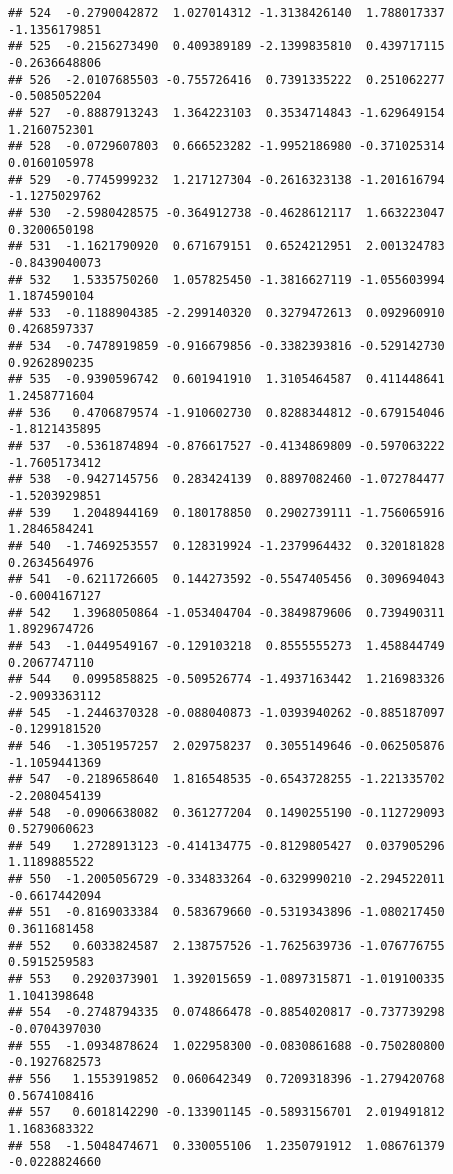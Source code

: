 \documentclass[
]{article}
\begin{document}
\begin{verbatim}
## 524  -0.2790042872  1.027014312 -1.3138426140  1.788017337 -1.1356179851
## 525  -0.2156273490  0.409389189 -2.1399835810  0.439717115 -0.2636648806
## 526  -2.0107685503 -0.755726416  0.7391335222  0.251062277 -0.5085052204
## 527  -0.8887913243  1.364223103  0.3534714843 -1.629649154  1.2160752301
## 528  -0.0729607803  0.666523282 -1.9952186980 -0.371025314  0.0160105978
## 529  -0.7745999232  1.217127304 -0.2616323138 -1.201616794 -1.1275029762
## 530  -2.5980428575 -0.364912738 -0.4628612117  1.663223047  0.3200650198
## 531  -1.1621790920  0.671679151  0.6524212951  2.001324783 -0.8439040073
## 532   1.5335750260  1.057825450 -1.3816627119 -1.055603994  1.1874590104
## 533  -0.1188904385 -2.299140320  0.3279472613  0.092960910  0.4268597337
## 534  -0.7478919859 -0.916679856 -0.3382393816 -0.529142730  0.9262890235
## 535  -0.9390596742  0.601941910  1.3105464587  0.411448641  1.2458771604
## 536   0.4706879574 -1.910602730  0.8288344812 -0.679154046 -1.8121435895
## 537  -0.5361874894 -0.876617527 -0.4134869809 -0.597063222 -1.7605173412
## 538  -0.9427145756  0.283424139  0.8897082460 -1.072784477 -1.5203929851
## 539   1.2048944169  0.180178850  0.2902739111 -1.756065916  1.2846584241
## 540  -1.7469253557  0.128319924 -1.2379964432  0.320181828  0.2634564976
## 541  -0.6211726605  0.144273592 -0.5547405456  0.309694043 -0.6004167127
## 542   1.3968050864 -1.053404704 -0.3849879606  0.739490311  1.8929674726
## 543  -1.0449549167 -0.129103218  0.8555555273  1.458844749  0.2067747110
## 544   0.0995858825 -0.509526774 -1.4937163442  1.216983326 -2.9093363112
## 545  -1.2446370328 -0.088040873 -1.0393940262 -0.885187097 -0.1299181520
## 546  -1.3051957257  2.029758237  0.3055149646 -0.062505876 -1.1059441369
## 547  -0.2189658640  1.816548535 -0.6543728255 -1.221335702 -2.2080454139
## 548  -0.0906638082  0.361277204  0.1490255190 -0.112729093  0.5279060623
## 549   1.2728913123 -0.414134775 -0.8129805427  0.037905296  1.1189885522
## 550  -1.2005056729 -0.334833264 -0.6329990210 -2.294522011 -0.6617442094
## 551  -0.8169033384  0.583679660 -0.5319343896 -1.080217450  0.3611681458
## 552   0.6033824587  2.138757526 -1.7625639736 -1.076776755  0.5915259583
## 553   0.2920373901  1.392015659 -1.0897315871 -1.019100335  1.1041398648
## 554  -0.2748794335  0.074866478 -0.8854020817 -0.737739298 -0.0704397030
## 555  -1.0934878624  1.022958300 -0.0830861688 -0.750280800 -0.1927682573
## 556   1.1553919852  0.060642349  0.7209318396 -1.279420768  0.5674108416
## 557   0.6018142290 -0.133901145 -0.5893156701  2.019491812  1.1683683322
## 558  -1.5048474671  0.330055106  1.2350791912  1.086761379 -0.0228824660

\end{verbatim}
\end{document}
